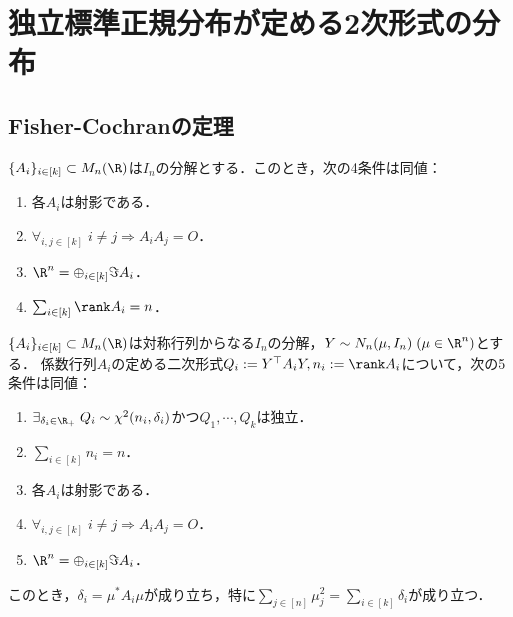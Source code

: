 \documentclass[uplatex,dvipdfmx]{jsreport}
\begin{document}
\section{独立標準正規分布が定める2次形式の分布}

\subsection{Fisher-Cochranの定理}

\begin{tcolorbox}[colframe=ForestGreen, colback=ForestGreen!10!white,breakable,colbacktitle=ForestGreen!40!white,coltitle=black,fonttitle=\bfseries\sffamily,
title=]
    
\end{tcolorbox}

\begin{theorem}
    $\{A_i\}_{i\in[k]}\subset M_n(\R)$は$I_n$の分解とする．このとき，次の4条件は同値：
    \begin{enumerate}
        \item 各$A_i$は射影である．
        \item $\forall_{i,j\in[k]}\;i\ne j\Rightarrow A_iA_j=O$．
        \item $\R^n=\oplus_{i\in[k]}\Im A_i$．
        \item $\sum_{i\in[k]}\rank A_i=n$．
    \end{enumerate}
\end{theorem}

\begin{theorem}
    $\{A_i\}_{i\in[k]}\subset M_n(\R)$は対称行列からなる$I_n$の分解，$Y\sim N_n(\mu,I_n)\;(\mu\in\R^n)$とする．
    係数行列$A_i$の定める二次形式$Q_i:=Y^\top A_iY,n_i:=\rank A_i$について，次の5条件は同値：
    \begin{enumerate}
        \item $\exists_{\delta_i\in\R_+}\;Q_i\sim\chi^2(n_i,\delta_i)$かつ$Q_1,\cdots,Q_k$は独立．
        \item $\sum_{i\in[k]}n_i=n$．
        \item 各$A_i$は射影である．
        \item $\forall_{i,j\in[k]}\;i\ne j\Rightarrow A_iA_j=O$．
        \item $\R^n=\oplus_{i\in[k]}\Im A_i$．
    \end{enumerate}
    このとき，$\delta_i=\mu^*A_i\mu$が成り立ち，特に$\sum_{j\in[n]}\mu_j^2=\sum_{i\in[k]}\delta_i$が成り立つ．
\end{theorem}
\end{document}
